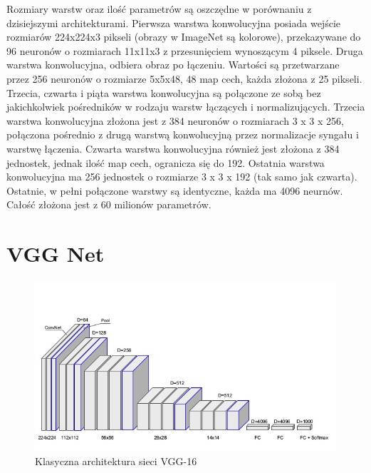 \documentclass[12pt,a4paper,twoside,titlepage,openright]{book}
\begin{document}
Rozmiary warstw oraz ilość parametrów są oszczędne w porównaniu z dzisiejszymi architekturami. Pierwsza warstwa konwolucyjna posiada wejście rozmiarów 224x224x3 pikseli (obrazy w ImageNet są kolorowe), przekazywane do 96 neuronów o rozmiarach 11x11x3 z przesunięciem wynoszącym 4 piksele. Druga warstwa konwolucyjna, odbiera obraz po łączeniu. Wartości są przetwarzane przez 256 neuronów o rozmiarze 5x5x48, 48 map cech, każda złożona z 25 pikseli. Trzecia, czwarta i piąta warstwa konwolucyjna są połączone ze sobą bez jakichkolwiek pośredników w rodzaju warstw łączących i normalizujących. Trzecia warstwa konwolucyjna złożona jest z 384 neuronów o rozmiarach 3 x 3 x 256, połączona pośrednio z drugą warstwą konwolucyjną przez normalizacje syngału i warstwę łączenia. Czwarta warstwa konwolucyjna również jest złożona z 384 jednostek, jednak ilość map cech, ogranicza się do 192. Ostatnia warstwa konwolucyjna ma 256 jednostek o rozmiarze 3 x 3 x 192 (tak samo jak czwarta). Ostatnie, w pełni połączone warstwy są identyczne, każda ma 4096 neurnów. Całość złożona jest z 60 milionów parametrów. \cite{NIPS2012_4824}

\section{VGG Net}
\begin{figure}[ht]
	\centering
			\includegraphics[resolution=100, scale=0.8]{VGGarchitecture.png}
		\caption{Klasyczna architektura sieci VGG-16}
\end{figure}
\end{document}
